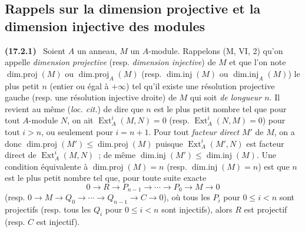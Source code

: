 \documentclass[10pt,oneside]{book}
\makeatletter
\newcommand{\setmanualcurrentlabel}[1]{\def\@currentlabel{#1}}
\newenvironment{env}[1][]{\setmanualcurrentlabel{#1}\par\medskip\noindent\textbf{(#1)}\ }{\par}
\makeatother
\begin{document}
\subsection{Rappels sur la dimension projective et la dimension injective des
modules}
\label{subsection:0.17.2-fr}

\begin{env}[17.2.1]
\label{0.17.2.1-fr}
Soient $A$ un anneau, $M$ un $A$-module. Rappelons (M, VI, 2) qu'on appelle
\emph{dimension projective} (resp. \emph{dimension injective}) de $M$ et que
l'on note $\operatorname{dim.proj}(M)$ ou
$\operatorname{dim.proj}_A(M)$ (resp. $\operatorname{dim.inj}(M)$ ou
$\operatorname{dim.inj}_A(M)$) le plus petit $n$ (entier ou égal à $+\infty$)
tel qu'il existe une résolution projective gauche (resp. une résolution
injective droite) de $M$ qui soit \emph{de longueur $n$}. Il revient au même
(\emph{loc. cit.}) de dire que $n$ est le plus petit nombre tel que pour tout
$A$-module $N$, on ait $\operatorname{Ext}^i_A(M,N)=0$ (resp.
$\operatorname{Ext}^i_A(N,M)=0$) pour tout $i>n$, ou seulement pour $i=n+1$.
Pour tout \emph{facteur direct} $M'$ de $M$, on a donc
$\operatorname{dim.proj}(M')\leq\operatorname{dim.proj}(M)$ puisque
$\operatorname{Ext}^i_A(M',N)$ est facteur direct de
$\operatorname{Ext}^i_A(M,N)$~; de même
$\operatorname{dim.inj}(M')\leq\operatorname{dim.inj}(M)$. Une condition
équivalente à $\operatorname{dim.proj}(M)=n$ (resp.
$\operatorname{dim.inj}(M)=n$) est que $n$ est le plus petit nombre tel que,
pour toute suite exacte
\[
  0\longrightarrow R\longrightarrow P_{n-1}\longrightarrow\cdots
  \longrightarrow P_0\longrightarrow M\longrightarrow0
\]
(resp.
$0\longrightarrow M\longrightarrow Q_0\longrightarrow\cdots
\longrightarrow Q_{n-1}\longrightarrow C\longrightarrow0$), où tous les
$P_i$ pour $0\leq i<n$ sont projectifs (resp. tous les $Q_i$ pour $0\leq i<n$
sont injectifs), alors $R$ est projectif (resp. $C$ est injectif).
\end{env}
\end{document}
